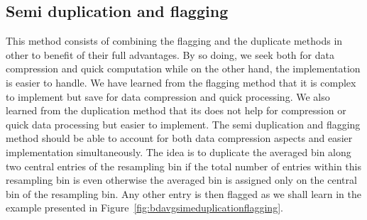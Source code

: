 \documentclass[useAMS,usenatbib]{mn2e}
\begin{document}
\subsection{Semi duplication and flagging}
This method consists of combining the flagging and the duplicate methods in other to benefit  of their full  advantages.
 By so doing, we seek both for data compression and  quick computation while on the other hand, the implementation is easier to
 handle. 
We have learned from the flagging method that it is complex to implement but save for data compression and quick processing. 
We also learned from the duplication method that its does not help for compression or quick data processing but easier to implement. The semi duplication and flagging method should be able to account for both data compression aspects and easier implementation simultaneously.
The idea is to duplicate the averaged bin along two central entries of the resampling bin if the total number of 
entries within this resampling bin is even otherwise the averaged bin is assigned only on the central bin of the resampling
bin. Any other entry is then flagged as we shall learn in the example presented in Figure~\ref{fig:bdavgsimeduplicationflagging}. 
\end{document}
